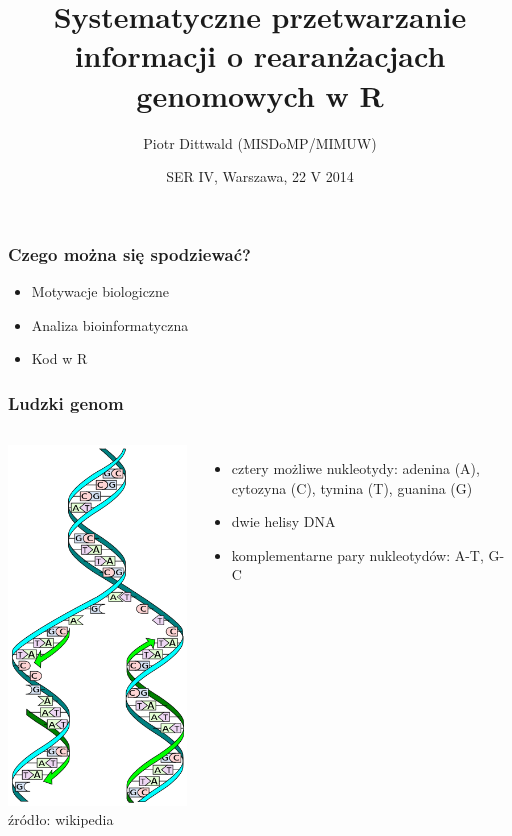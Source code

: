 \documentclass[table]{beamer}
\title{Systematyczne przetwarzanie informacji o rearanżacjach genomowych w R}
\author{Piotr Dittwald (MISDoMP/MIMUW)}
\institute{piotr.dittwald@gmail.com}
\date{SER IV, Warszawa, \small{22 V 2014}}
\begin{document}
\begin{frame}
  \titlepage
\end{frame}

\begin{frame}
\frametitle{Czego można się spodziewać?}
\begin{itemize}
\item Motywacje biologiczne
\item Analiza bioinformatyczna
\item Kod w R
\end{itemize}
\end{frame}


\begin{frame}\frametitle{Ludzki genom}
 \begin{columns}
	    \begin{center}
	   \includegraphics[width=0.6 \textwidth]{SER-images/DNA_replication.png}\\
	   \tiny{źródło: wikipedia}  
	    \end{center}
\begin{itemize}
\item cztery możliwe nukleotydy: adenina (A), cytozyna (C), tymina (T), guanina (G)
\item dwie helisy DNA
\item komplementarne pary nukleotydów: A-T, G-C 
\end{itemize}
\end{columns}
\end{frame}
\end{document}

